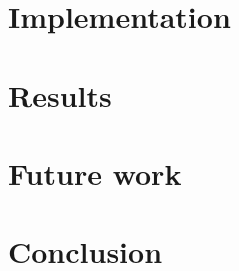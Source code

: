 \documentclass[12pt,oneside,letterpaper,article]{memoir}
\begin{document}
    \newpage
    \chapter{Implementation}\label{sec:implementation}
    
    
    
    
    \newpage
    \chapter{Results}\label{sec:results}
    
    
    
    
    
    \newpage
    \chapter{Future work}
    
    
    \chapter{Conclusion}
    
    
    \begin{appendices}
        
    \end{appendices}

    
    \backmatter
    
    \let\endsection\chapter
    \renewcommand{\section}[2]{}%
    
    \newpage
    \printglossary[type=\acronymtype]
    
    \printglossary
    
    \newpage
    \printbibliography
\end{document}
